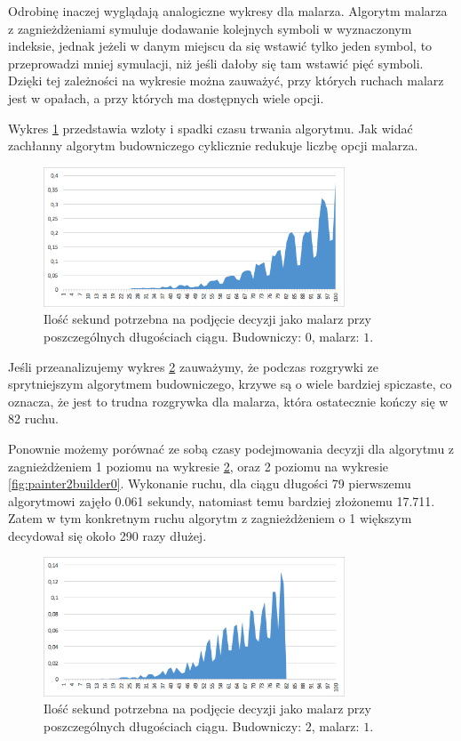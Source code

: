 \documentclass[document]{xmgr}
\begin{document}
Odrobinę inaczej wyglądają analogiczne wykresy dla malarza. Algorytm malarza z zagnieżdżeniami symuluje dodawanie kolejnych symboli w wyznaczonym indeksie, jednak jeżeli w danym miejscu da się wstawić tylko jeden symbol, to przeprowadzi mniej symulacji, niż jeśli dałoby się tam wstawić pięć symboli. Dzięki tej zależności na wykresie można zauważyć, przy których ruchach malarz jest w opałach, a przy których ma dostępnych wiele opcji.

Wykres \ref{fig:painter1builder0} przedstawia wzloty i spadki czasu trwania algorytmu. Jak widać zachłanny algorytm budowniczego cyklicznie redukuje liczbę opcji malarza.

\begin{figure}[tbh]
    \centering
    \includegraphics[width = 0.8\textwidth]{images/timePainter1Builder0}
    \caption{Ilość sekund potrzebna na podjęcie decyzji jako malarz przy poszczególnych długościach ciągu. Budowniczy: $0$, malarz: $1$.}
    \label{fig:painter1builder0}
\end{figure}

Jeśli przeanalizujemy wykres \ref{fig:painter1builder2} zauważymy, że podczas rozgrywki ze sprytniejszym algorytmem budowniczego, krzywe są o wiele bardziej spiczaste, co oznacza, że jest to trudna rozgrywka dla malarza, która ostatecznie kończy się w 82 ruchu.

Ponownie możemy porównać ze sobą czasy podejmowania decyzji dla algorytmu z zagnieżdżeniem 1 poziomu na wykresie \ref{fig:painter1builder2}, oraz 2 poziomu na wykresie \ref{fig:painter2builder0}. Wykonanie ruchu, dla ciągu długości 79 pierwszemu algorytmowi zajęło 0.061 sekundy, natomiast temu bardziej złożonemu 17.711. Zatem w tym konkretnym ruchu algorytm z zagnieżdżeniem o 1 większym decydował się około 290 razy dłużej.

\begin{figure}[tbh]
    \centering
    \includegraphics[width = 0.8\textwidth]{images/timePainter1Builder2}
    \caption{Ilość sekund potrzebna na podjęcie decyzji jako malarz przy poszczególnych długościach ciągu. Budowniczy: $2$, malarz: $1$.}
    \label{fig:painter1builder2}
\end{figure}
\end{document}
